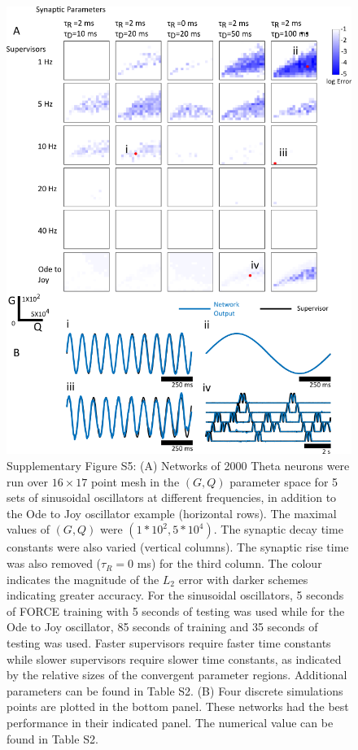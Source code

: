 \documentclass[11pt]{article} %
\begin{document}
\clearpage

\begin{figure}[htp!]
\centering
\includegraphics[scale=0.8]{FFIGS7}
\caption*{Supplementary Figure S5:  (A) Networks of 2000 Theta neurons were run over $16\times17$ point mesh in the $(G,Q)$ parameter space for 5 sets of sinusoidal oscillators at different frequencies, in addition to the Ode to Joy oscillator example (horizontal rows).  The maximal values of $(G,Q)$ were $(1*10^2,5*10^4)$.  The synaptic decay time constants were also varied (vertical columns).  The synaptic rise time was also removed ($\tau_R =0$ ms) for the third column.  The colour indicates the magnitude of the $L_2$ error with darker schemes indicating greater accuracy.  For the sinusoidal oscillators, 5 seconds of FORCE training with 5 seconds of testing was used while for the Ode to Joy oscillator, 85 seconds of training and 35 seconds of testing was used.  Faster supervisors require faster time constants while slower supervisors require slower time constants, as indicated by the relative sizes of the convergent parameter regions.  Additional parameters can be found in Table S2.  (B)  Four discrete simulations points are plotted in the bottom panel.  These networks had the best performance in their indicated panel. The numerical value can be found in Table S2.}   
\end{figure}
\end{document}
